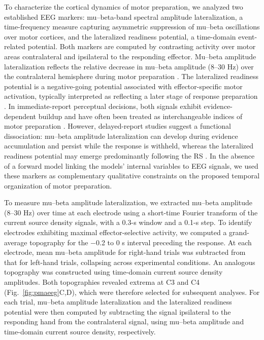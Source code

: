 \documentclass[a4paper,11pt]{article}
\theoremstyle{definition}
\newcommand{\1}{\mathbbm{1}}
\begin{document}
To characterize the cortical dynamics of motor preparation, we analyzed two established EEG markers: mu--beta-band spectral amplitude lateralization, a time-frequency measure capturing asymmetric suppression of mu--beta oscillations over motor cortices, and the lateralized readiness potential, a time-domain event-related potential. Both markers are computed by contrasting activity over motor areas contralateral and ipsilateral to the responding effector. Mu--beta amplitude lateralization reflects the relative decrease in mu--beta amplitude (8--30 Hz) over the contralateral hemisphere during motor preparation \parencite{pfurtschellerEventrelatedEEGMEG1999}. The lateralized readiness potential is a negative-going potential associated with effector-specific motor activation, typically interpreted as reflecting a later stage of response preparation \parencites{eimerLateralizedReadinessPotential1998}{grattonPrePoststimulusActivation1988}. In immediate-report perceptual decisions, both signals exhibit evidence-dependent buildup and have often been treated as interchangeable indices of motor preparation \parencites{kellyInternalExternalInfluences2013}{kellyNeurocomputationalMechanismsPriorinformed2021}. However, delayed-report studies suggest a functional dissociation: mu--beta amplitude lateralization can develop during evidence accumulation and persist while the response is withheld, whereas the lateralized readiness potential may emerge predominantly following the RS \parencite{roggeMotorCorticalSignals2022}. In the absence of a forward model linking the models' internal variables to EEG signals, we used these markers as complementary qualitative constraints on the proposed temporal organization of motor preparation.

To measure mu--beta amplitude lateralization, we extracted mu--beta amplitude (8--30 Hz) over time at each electrode using a short-time Fourier transform of the current source density signals, with a 0.3-s window and a 0.1-s step. To identify electrodes exhibiting maximal effector-selective activity, we computed a grand-average topography for the $-$0.2 to 0 s interval preceding the response. At each electrode, mean mu--beta amplitude for right-hand trials was subtracted from that for left-hand trials, collapsing across experimental conditions. An analogous topography was constructed using time-domain current source density amplitudes. Both topographies revealed extrema at C3 and C4 (Fig.~\ref{fig:pmaeeg}C,D), which were therefore selected for subsequent analyses. For each trial, mu--beta amplitude lateralization and the lateralized readiness potential were then computed by subtracting the signal ipsilateral to the responding hand from the contralateral signal, using mu--beta amplitude and time-domain current source density, respectively.
\end{document}
